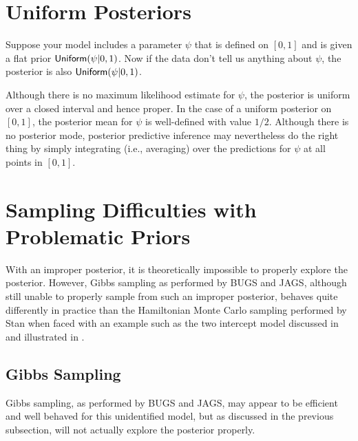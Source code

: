 \section{Uniform Posteriors}

Suppose your model includes a parameter $\psi$ that is defined on
$[0,1]$ and is given a flat prior $\mbox{\sf Uniform}(\psi|0,1)$. Now if
the data don't tell us anything about $\psi$, the posterior is also
$\mbox{\sf Uniform}(\psi|0,1)$.

Although there is no maximum likelihood estimate for $\psi$, the
posterior is uniform over a closed interval and hence proper.  In the
case of a uniform posterior on $[0,1]$, the posterior mean for $\psi$
is well-defined with value $1/2$.  Although there is no posterior
mode, posterior predictive inference may nevertheless do the right
thing by simply integrating (i.e., averaging) over the predictions for
$\psi$ at all points in $[0,1]$.


\section{Sampling Difficulties with Problematic Priors}

With an improper posterior, it is theoretically impossible to properly
explore the posterior. However, Gibbs sampling as performed by BUGS
and JAGS, although still unable to properly sample from such an
improper posterior, behaves quite differently in practice than the
Hamiltonian Monte Carlo sampling performed by Stan when faced with an
example such as the two intercept model discussed in
 and illustrated in
.

\subsection{Gibbs Sampling}

Gibbs sampling, as performed by BUGS and JAGS, may appear to be
efficient and well behaved for this unidentified model, but as
discussed in the previous subsection, will not actually explore the
posterior properly.

